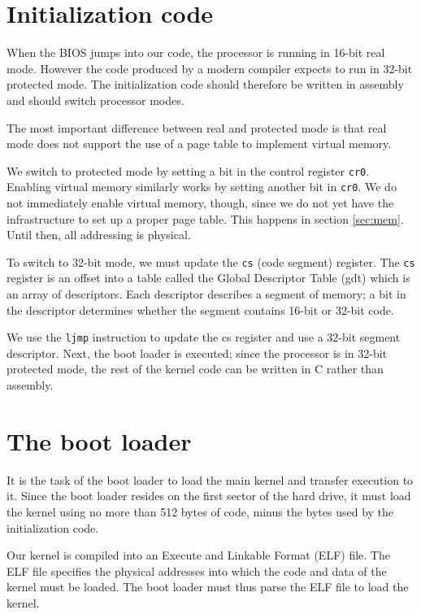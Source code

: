 \documentclass{report}
\begin{document}
\section{Initialization code}
When the BIOS jumps into our code, the processor is running in 16-bit real
mode. However the code produced by a modern compiler expects to run in 32-bit
protected mode. The initialization code should therefore be written in
assembly and should switch processor modes.

The most important difference between real and protected mode is that real
mode does not support the use of a page table to implement virtual memory.

We switch to protected mode by setting a bit in the control register
\texttt{cr0}. Enabling virtual memory similarly works by setting another bit
in \texttt{cr0}. We do not immediately enable virtual memory, though, since we
do not yet have the infrastructure to set up a proper page table. This happens
in section \ref{sec:mem}. Until then, all addressing is physical.

To switch to 32-bit mode, we must update the \texttt{cs} (code segment)
register. The \texttt{cs} register is an offset into a table called the Global
Descriptor Table (\gls{gdt}) which is an array of descriptors. Each descriptor
describes a segment of memory; a bit in the descriptor determines whether the
segment contains 16-bit or 32-bit code. 

We use the \texttt{ljmp} instruction to update the \gls{cs} register and use a
32-bit segment descriptor. Next, the boot loader is executed; since the
processor is in 32-bit protected mode, the rest of the kernel code can be
written in C rather than assembly.




\section{The boot loader}
It is the task of the boot loader to load the main kernel and transfer
execution to it. Since the boot loader resides on the first sector of the hard
drive, it must load the kernel using no more than 512 bytes of code, minus the
bytes used by the initialization code.

Our kernel is compiled into an Execute and Linkable Format (ELF) file. The ELF
file specifies the physical addresses into which the code and data of the
kernel must be loaded. The boot loader must thus parse the ELF file to load
the kernel.
\end{document}
